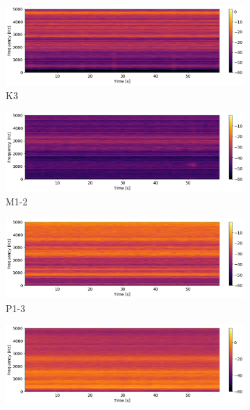 \begin{figure}[h]
    \centering
    \begin{subfigure}[b]{0.48\textwidth}
        \includegraphics[width=\textwidth]{assets/results/time-frequency-spectrum/K3-z-STFT.png}
        \caption{K3}
    \end{subfigure}
    \hfill
    \begin{subfigure}[b]{0.48\textwidth}
        \includegraphics[width=\textwidth]{assets/results/time-frequency-spectrum/M1-2-z-STFT.png}
        \caption{M1-2}
    \end{subfigure}
    \hfill
    \begin{subfigure}[b]{0.48\textwidth}
        \includegraphics[width=\textwidth]{assets/results/time-frequency-spectrum/P1-3-z-STFT.png}
        \caption{P1-3}
    \end{subfigure}
	\hfill
	\begin{subfigure}[b]{0.48\textwidth}
        \includegraphics[width=\textwidth]{assets/results/time-frequency-spectrum/P3-3-z-STFT.png}

\end{subfigure}
\end{figure}
